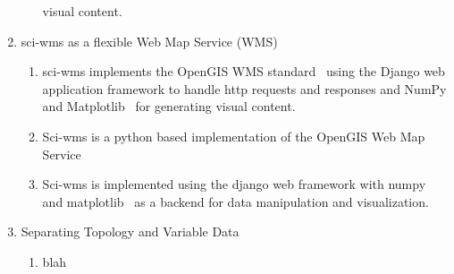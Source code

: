 \documentclass{article}
\begin{document}
\begin{enumerate}
\begin{enumerate}[label*=\arabic*.]
        visual content.
    \end{enumerate}
  \item sci-wms as a flexible Web Map Service (WMS)
    \begin{enumerate}[label*=\arabic*.]
      \item sci-wms implements the OpenGIS WMS standard~\cite{wms14}
        using the Django web application framework to handle http
        requests and responses and NumPy and
        Matplotlib~\cite{numpy11,hunter07} for generating visual content.
      \item Sci-wms is a python based implementation of the OpenGIS Web Map Service~\cite{wms14}
      \item Sci-wms is implemented using the django web framework with
        numpy~\cite{numpy11} and matplotlib~\cite{hunter07} as a backend for data manipulation and
        visualization.
    \end{enumerate}
    \item Separating Topology and Variable Data
      \begin{enumerate}[label*=\arabic*.]
        \item blah
      \end{enumerate}
\end{enumerate}

\nocite{pyugrid}
\nocite{wms14}


\end{document}
